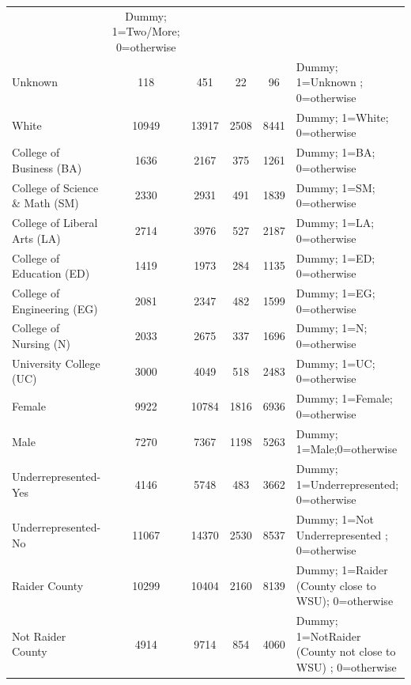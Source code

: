 \documentclass[12pt,english]{report}
\begin{document}
\begin{table}
\begin{adjustbox}{width=1.05\textwidth}
\begin{tabular}{lccccl}
& Dummy; 1=Two/More; 0=otherwise              \\
Unknown                         & 118      & 451          & 22        & 96     
& Dummy; 1=Unknown ; 0=otherwise              \\
White                           & 10949   & 13917       & 2508      & 8441     
& Dummy; 1=White; 0=otherwise                 \\
College of Business (BA)        & 1636    & 2167        & 375       & 1261     
& Dummy; 1=BA; 0=otherwise                    \\
College of Science \& Math (SM) & 2330    & 2931        & 491       & 1839     
& Dummy; 1=SM; 0=otherwise                    \\
College of Liberal Arts (LA)    & 2714    & 3976        & 527       & 2187     
& Dummy; 1=LA; 0=otherwise                    \\
College of Education (ED)       & 1419    & 1973        & 284       & 1135     
& Dummy; 1=ED; 0=otherwise                    \\
College of Engineering (EG)     & 2081    & 2347        & 482       & 1599     
& Dummy; 1=EG; 0=otherwise                    \\
College of Nursing (N)          & 2033    & 2675        & 337       & 1696     
& Dummy; 1=N; 0=otherwise                     \\
University College  (UC)        & 3000    & 4049        & 518       & 2483     
& Dummy; 1=UC; 0=otherwise                    \\
Female                          & 9922    & 10784       & 1816  & 6936  &
Dummy; 1=Female; 0=otherwise  \\
Male                            & 7270    & 7367        & 1198      & 5263   &
Dummy; 1=Male;0=otherwise    \\
Underrepresented-Yes            & 4146    & 5748        & 483       & 3662     
& Dummy; 1=Underrepresented; 0=otherwise      \\
Underrepresented-No             & 11067   & 14370       & 2530      & 8537     
& Dummy; 1=Not Underrepresented ; 0=otherwise\\
Raider County         & 10299   & 10404   & 2160        &  8139     & Dummy;
1=Raider (County close to WSU); 0=otherwise                     \\
Not Raider County  & 4914       & 9714     & 854       & 4060        & Dummy;
1=NotRaider (County not close to WSU) ; 0=otherwise   \\
 \hline 
\end{tabular}
\end{adjustbox}
\end{table}
\end{document}
